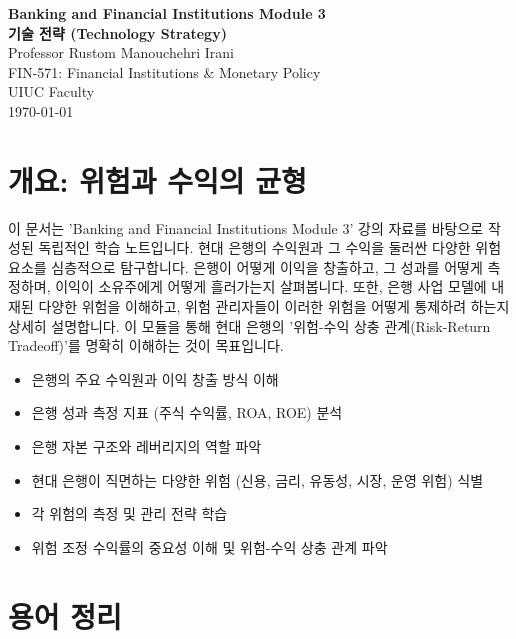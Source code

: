 \documentclass[11pt,a4paper]{article}
\begin{document}
\begin{titlepage}
    \centering
    \vspace*{1cm}
    {\Huge\textbf{Banking and Financial Institutions Module 3}}\\[1cm]
    {\Large\textbf{기술 전략 (Technology Strategy)}}\\[1.5cm]
    {\Large Professor Rustom Manouchehri Irani}\\[2cm]
    {\Large FIN-571: Financial Institutions \& Monetary Policy}\\[0.5cm]
    {\Large UIUC Faculty}\\[3cm]
    \vfill
    {\large \today}
\end{titlepage}

\newpage
\tableofcontents
\newpage

\section{개요: 위험과 수익의 균형}

이 문서는 'Banking and Financial Institutions Module 3' 강의 자료를 바탕으로 작성된 독립적인 학습 노트입니다.
현대 은행의 수익원과 그 수익을 둘러싼 다양한 위험 요소를 심층적으로 탐구합니다.
은행이 어떻게 이익을 창출하고, 그 성과를 어떻게 측정하며, 이익이 소유주에게 어떻게 흘러가는지 살펴봅니다.
또한, 은행 사업 모델에 내재된 다양한 위험을 이해하고, 위험 관리자들이 이러한 위험을 어떻게 통제하려 하는지 상세히 설명합니다.
이 모듈을 통해 현대 은행의 '위험-수익 상충 관계(Risk-Return Tradeoff)'를 명확히 이해하는 것이 목표입니다.

\begin{tcolorbox}[summarybox, title=\textbf{학습 목표 요약}]
\begin{itemize}
    \item 은행의 주요 수익원과 이익 창출 방식 이해
    \item 은행 성과 측정 지표 (주식 수익률, ROA, ROE) 분석
    \item 은행 자본 구조와 레버리지의 역할 파악
    \item 현대 은행이 직면하는 다양한 위험 (신용, 금리, 유동성, 시장, 운영 위험) 식별
    \item 각 위험의 측정 및 관리 전략 학습
    \item 위험 조정 수익률의 중요성 이해 및 위험-수익 상충 관계 파악
\end{itemize}
\end{tcolorbox}

\newpage
\section{용어 정리}
\end{document}
